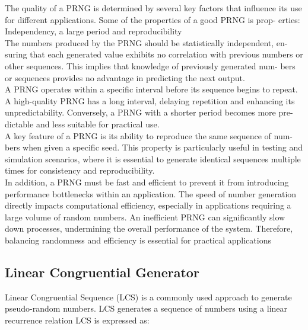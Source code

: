 The quality of a PRNG is determined by several key factors that influence its
use for different applications. Some of the properties of a good PRNG is prop-
erties: Independency, a large period and reproducibility
\newline \\
The numbers produced by the PRNG should be statistically independent, en-
suring that each generated value exhibits no correlation with previous numbers
or other sequences. This implies that knowledge of previously generated num-
bers or sequences provides no advantage in predicting the next output.
\newline \\
A PRNG operates within a specific interval before its sequence begins to repeat.
A high-quality PRNG has a long interval, delaying repetition and enhancing its
unpredictability. Conversely, a PRNG with a shorter period becomes more pre-
dictable and less suitable for practical use.
\newline \\
A key feature of a PRNG is its ability to reproduce the same sequence of num-
bers when given a specific seed. This property is particularly useful in testing
and simulation scenarios, where it is essential to generate identical sequences
multiple times for consistency and reproducibility.
\newline \\
In addition, a PRNG must be fast and efficient to prevent it from introducing
performance bottlenecks within an application. The speed of number generation
directly impacts computational efficiency, especially in applications requiring a
large volume of random numbers. An inefficient PRNG can significantly slow
down processes, undermining the overall performance of the system. Therefore,
balancing randomness and efficiency is essential for practical applications

\subsection{Linear Congruential Generator}

Linear Congruential Sequence (LCS) is a commonly used approach to generate
pseudo-random numbers. LCS generates a sequence of numbers using a linear
recurrence relation LCS is expressed as:

